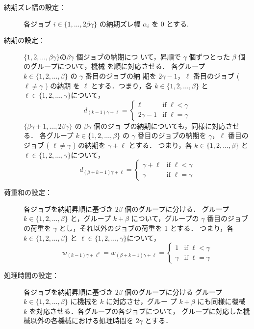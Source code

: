 \documentclass[12pt]{optlab-bachelor}
\begin{document}
\begin{description}
  \item[納期ズレ幅の設定：]
  各ジョブ $i \in \{1,\ldots,2\beta \gamma\}$ の納期ズレ幅
  $\alpha_i$ を 0 とする.
  \item[納期の設定：] $\{1,2,\ldots, \beta \gamma\}$$ の $$\beta \gamma$ 個ジョブの納期につ
  いて，昇順で $\gamma$ 個ずつとった $\beta$ 個のグループについて，機械
  を順に対応させる．
  各グループ $k \in \{1,2,\ldots, \beta\}$ の $\gamma$ 番目のジョブの納
  期を $2\gamma - 1$，$\ell$ 番目のジョブ ( $\ell \neq \gamma$ ) の納期
  を $\ell$ とする．つまり，各 $k \in \{1,2,\ldots, \beta\}$ と $\ell \in \{1,2,\ldots,
  \gamma\}$について，
  $$d_{(k - 1)\gamma + \ell} = \left\{ \begin{array}{ll} \ell & \text{if } \ell < \gamma \\ 2\gamma - 1 & \text{if } \ell = \gamma \end{array} \right.$$
  $\{\beta \gamma + 1,\ldots, 2\beta \gamma\}$ の $\beta \gamma$ 個のジョ
  ブの納期についても，同様に対応させる．
  各グループ $k \in \{1,2,\ldots, \beta\}$ の $\gamma$ 番目のジョブの納期を $\gamma$，$\ell$ 番目のジョブ ( $\ell \neq \gamma$ ) の納期を $\gamma + \ell$ とする．
  つまり，各 $k \in \{1,2,\ldots, \beta\}$ と $\ell \in \{1,2,\ldots,
  \gamma\}$について，
  $$d_{(\beta + k - 1)\gamma + \ell} = \left\{ \begin{array}{ll}\gamma +  \ell & \text{if } \ell < \gamma \\ \gamma & \text{if } \ell = \gamma \end{array} \right.$$
  \item[荷重和の設定：] 各ジョブを納期昇順に基づき $2\beta$ 個のグループに分ける．
  グループ $k \in \{1,2,\ldots,\beta\}$ と，グループ $k + \beta$ について，グループの $\gamma$ 番目のジョブの荷重を $\gamma$ とし，それ以外のジョブの荷重を 1 とする．
  つまり，各 $k \in \{1,2,\ldots, \beta\}$ と $\ell \in \{1,2,\ldots,
  \gamma\}$について，
  $$w_{(k - 1)\gamma + \ell^v} = w_{(\beta + k - 1)\gamma + \ell} = \left\{ \begin{array}{ll} 1 & \text{if } \ell < \gamma \\ \gamma & \text{if } \ell = \gamma \end{array} \right.$$
  \item[処理時間の設定：] 各ジョブを納期昇順に基づき $2\beta$ 個のグループに分ける
  グループ $k \in \{1,2,\ldots,\beta\}$ に機械を $k$ に対応させ，グルー
  プ $k + \beta$ にも同様に機械 $k$ を対応させる．各グループの各ジョブについて， グループに対応した機械以外の各機械における処理時間を $2\gamma$ とする．

\end{description}
\end{document}
